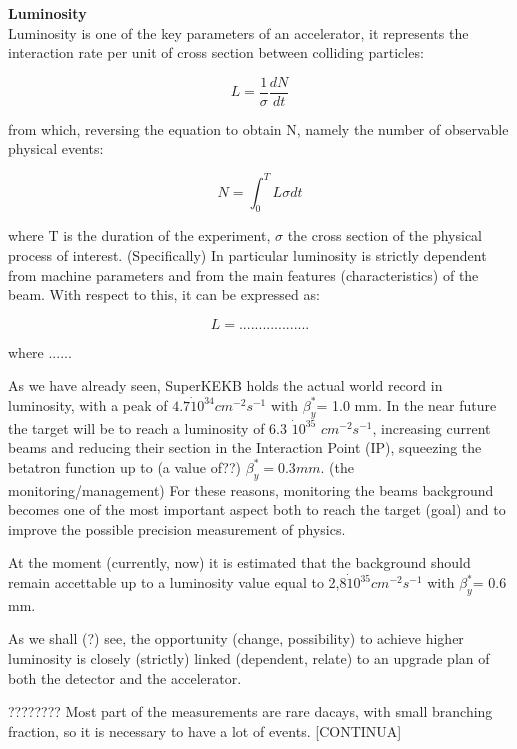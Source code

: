 \textbf{Luminosity}\\

Luminosity is one of the key parameters of an accelerator, it represents the interaction rate per unit of cross section between colliding particles:

\begin{equation}
L =\frac{1}{\sigma}\frac{dN}{dt} 
\end{equation}

from which, reversing the equation to obtain N, namely the number of observable physical events:

\begin{equation}
N = \int_{0}^{T} L\sigma dt
\end{equation}

where T is the duration of the experiment,  $\sigma$ the cross section of the physical process of interest.
(Specifically) In particular luminosity is strictly dependent from machine parameters and from the main features (characteristics) of the beam. With respect to this, it can be expressed as:

\begin{equation}
L = ..................
\end{equation}

where ......


As we have already seen, SuperKEKB holds the actual world record in luminosity, with a peak of $4.7\dot10^{34} cm^{-2}s^{-1}$ with $\beta^{*}_{y}$= 1.0 mm. In the near future the target will be to reach a luminosity of 6.3 $\dot 10^{35}$ $cm^{-2} s^{-1}$, increasing current beams and reducing their section in the Interaction Point (IP), squeezing the betatron function up to (a value of??) $\beta^{*}_{y}= 0.3 mm$.
(the monitoring/management) For these reasons, monitoring the beams background becomes one of the most important aspect both to reach the target (goal) and to improve the possible precision measurement of physics. 

At the moment (currently, now) it is estimated that the background should remain accettable up to a luminosity value equal to 2,8$\dot 10^{35} cm^{-2} s^{-1}$ with $\beta^{*}_{y}$= 0.6 mm.

As we shall (?) see, the opportunity (change, possibility) to achieve higher luminosity is closely (strictly) linked (dependent, relate) to an upgrade plan of both the detector and the accelerator.

???????? Most part of the measurements are rare dacays, with small branching fraction, so it is necessary to have a lot of events. [CONTINUA]\\




